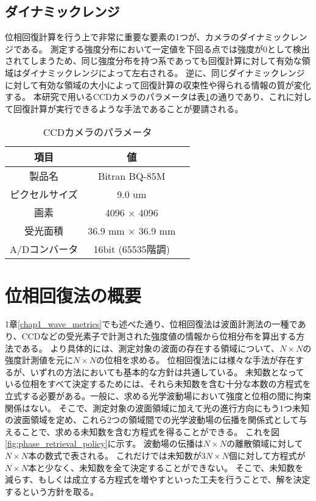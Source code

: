 \subsection{ダイナミックレンジ}
\label{chap3_dynamic_range}

位相回復計算を行う上で非常に重要な要素の1つが、カメラのダイナミックレンジである。
測定する強度分布において一定値を下回る点では強度が0として検出されてしまうため、同じ強度分布を持つ系であっても回復計算に対して有効な領域はダイナミックレンジによって左右される。
逆に、同じダイナミックレンジに対して有効な領域の大小によって回復計算の収束性や得られる情報の質が変化する。
本研究で用いるCCDカメラのパラメータは表\ref{tb:ccd_camera_params}の通りであり、これに対して回復計算が実行できるような手法であることが要請される。

\begin{table}[!ht]
\begin{center}
  \begin{tabular}{|c|c|l|} \hline
    項目 & 値 \\ \hline
    製品名 & Bitran BQ-85M \\
    ピクセルサイズ & 9.0 um \\
    画素 & 4096 $\times$ 4096 \\
    受光面積 & 36.9 mm $\times$ 36.9 mm \\
    A/Dコンバータ & 16bit (65535階調) \\ \hline
  \end{tabular}
  \caption{CCDカメラのパラメータ}
  \label{tb:ccd_camera_params}
\end{center}
\end{table}

\clearpage
\newpage


\section{位相回復法の概要}
\label{chap3_phase_retrieval_introduction}

1章\ref{chap1_wave_metrics}でも述べた通り、位相回復法は波面計測法の一種であり、CCDなどの受光素子で計測された強度値の情報から位相分布を算出する方法である。
より具体的には、測定対象の波面の存在する領域について、$N \times N$の強度計測値を元に$N \times N$の位相を求める。
位相回復法には様々な手法が存在するが、いずれの方法においても基本的な方針は共通している。
未知数となっている位相をすべて決定するためには、それら未知数を含む十分な本数の方程式を立式する必要がある。一般に、求める光学波動場において強度と位相の間に拘束関係はない。
そこで、測定対象の波面領域に加えて光の進行方向にもう1つ未知の波面領域を定め、これら2つの領域間での光学波動場の伝播を関係式として与えることで、求める未知数を含む方程式を得ることができる。
これを図\ref{fig:phase_retrieval_policy}に示す。
波動場の伝播は$N \times N$の離散領域に対して$N \times N$本の数式で表される。
これだけでは未知数が$3N \times N$個に対して方程式が$N \times N$本と少なく、未知数を全て決定することができない。
そこで、未知数を減らす、もしくは成立する方程式を増やすといった工夫を行うことで、解を決定するという方針を取る。

